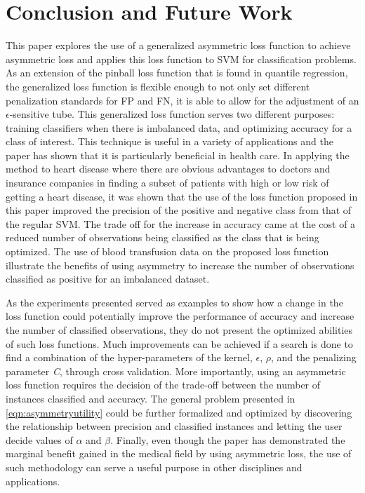 \documentclass[twoside,11pt]{article}
\begin{document}
\section{Conclusion and Future Work}
 This paper explores the use of a generalized asymmetric loss function to achieve asymmetric loss and applies this loss function to SVM for classification problems. As an extension of the pinball loss function that is found in quantile regression, the generalized loss function is flexible enough to not only set different penalization standards for FP and FN, it is able to allow for the adjustment of an  $\epsilon$-sensitive tube. This generalized loss function serves two different purposes: training classifiers when there is imbalanced data, and optimizing accuracy for a class of interest. This technique is useful in a variety of applications and the paper has shown that it is particularly beneficial in health care. In applying the method to heart disease where there are obvious advantages to doctors and insurance companies in finding a subset of patients with high or low risk of getting a heart disease, it was shown that the use of the loss function proposed in this paper improved the precision of the positive and negative class from that of the regular SVM. The trade off for the increase in accuracy came at the cost of a reduced number of observations being classified as the class that is being optimized. The use of blood transfusion data on the proposed loss function illustrate the benefits of using asymmetry to increase the number of observations classified as positive for an imbalanced dataset. 

 As the experiments presented served as examples to show how a change in the loss function could potentially improve the performance of accuracy and increase the number of classified observations, they do not present the optimized abilities of such loss functions. Much improvements can be achieved if a search is done to find a combination of the hyper-parameters of the kernel, $\epsilon$, $\rho$, and the penalizing parameter \emph{C}, through cross validation. More importantly, using an asymmetric loss function requires the decision of the trade-off between the number of instances classified and accuracy. The general problem  presented in \ref{eqn:asymmetryutility} could be further formalized and optimized by discovering the relationship between precision and classified instances and letting the user decide values of $\alpha$ and $\beta$. Finally, even though the paper has demonstrated the marginal benefit gained in the medical field by using asymmetric loss, the use of such methodology can serve a useful purpose in other disciplines and applications.


\end{document}
